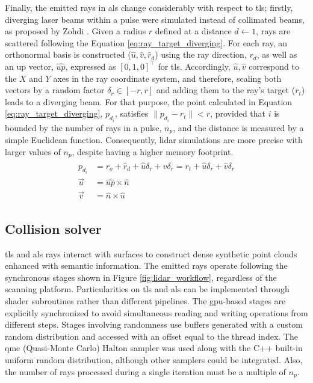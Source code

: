Finally, the emitted rays in \acrshort{als} change considerably with respect to \acrshort{tls}; firstly, diverging laser beams within a pulse were simulated instead of collimated beams, as proposed by Zohdi \cite{zohdi_rapid_2020}. Given a radius $r$ defined at a distance $d \gets 1$, rays are scattered following the Equation \ref{eq:ray_target_diverging}. For each ray, an orthonormal basis is constructed ($\hat{u}, \hat{v}, \hat{r}_{d}$) using the ray direction, $r_{d}$, as well as an up vector, $\widehat{\textit{up}}$, expressed as $\left[0, 1, 0\right]^\intercal$ for \acrshort{tls}. Accordingly, $\hat{u}, \hat{v}$ correspond to the $X$ and $Y$ axes in the ray coordinate system, and therefore, scaling both vectors by a random factor $\delta_{r} \in [-r, r]$ and adding them to the ray's target ($r_{t}$) leads to a diverging beam. For that purpose, the point calculated in Equation \ref{eq:ray_target_diverging}, $p_{d_{i}}$, satisfies $\lVert p_{d_{i}} - r_{t}\rVert < r$, provided that $i$ is bounded by the number of rays in a pulse, $n_{p}$, and the distance is measured by a simple Euclidean function. Consequently, \acrshort{lidar} simulations are more precise with larger values of $n_{p}$, despite having a higher memory footprint.
\begin{gather}
    \label{eq:ray_target_diverging}
    \begin{aligned}
        p_{d_{i}} &= r_{o} + \hat{r}_{d} + \hat{u}\delta_{r} + \hat{v}\delta_{r} = r_{t} + \hat{u}\delta_{r} + \hat{v}\delta_{r}\\
        \vec{u} &= \widehat{\textit{up}} \times \hat{n}\\
        \vec{v} &= \hat{n} \times \hat{u}
    \end{aligned}
\end{gather}

\subsection{Collision solver}

\acrshort{tls} and \acrshort{als} rays interact with surfaces to construct dense synthetic point clouds enhanced with semantic information. The emitted rays operate following the synchronous stages shown in Figure \ref{fig:lidar_workflow}, regardless of the scanning platform. Particularities on \acrshort{tls} and \acrshort{als} can be implemented through shader subroutines rather than different pipelines. The \acrshort{gpu}-based stages are explicitly synchronized to avoid simultaneous reading and writing operations from different steps. Stages involving randomness use buffers generated with a custom random distribution and accessed with an offset equal to the thread index. The \acrshort{qmc} (Quasi-Monte Carlo) Halton sampler was used along with the C++ built-in uniform random distribution, although other samplers could be integrated. Also, the number of rays processed during a single iteration must be a multiple of $n_{p}$.

